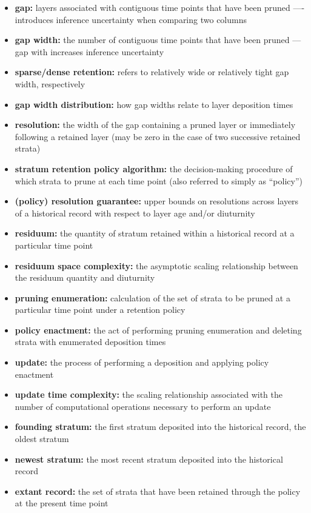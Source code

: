 \begin{itemize}
  \item \textbf{gap:} layers associated with contiguous time points that have been pruned ---- introduces inference uncertainty when comparing two columns
  \item \textbf{gap width:} the number of contiguous time points that have been pruned --- gap with increases inference uncertainty
  \item \textbf{sparse/dense retention:} refers to relatively wide or relatively tight gap width, respectively
  \item \textbf{gap width distribution:} how gap widths relate to layer deposition times
  \item \textbf{resolution:} the width of the gap containing a pruned layer or immediately following a retained layer (may be zero in the case of two successive retained strata)
  \item \textbf{stratum retention policy algorithm:} the decision-making procedure of which strata to prune at each time point (also referred to simply as ``policy'')
  \item \textbf{(policy) resolution guarantee:} upper bounds on resolutions across layers of a historical record with respect to layer age and/or diuturnity
  \item \textbf{residuum:} the quantity of stratum retained within a historical record at a particular time point
  \item \textbf{residuum space complexity:} the asymptotic scaling relationship between the residuum quantity and diuturnity
  \item \textbf{pruning enumeration:} calculation of the set of strata to be pruned at a particular time point under a retention policy
  \item \textbf{policy enactment:} the act of performing pruning enumeration and deleting strata with enumerated deposition times
  \item \textbf{update:} the process of performing a deposition and applying policy enactment
  \item \textbf{update time complexity:} the scaling relationship associated with the number of computational operations necessary to perform an update
  \item \textbf{founding stratum:} the first stratum deposited into the historical record, the oldest stratum
  \item \textbf{newest stratum:} the most recent stratum deposited into the historical record
  \item \textbf{extant record:} the set of strata that have been retained through the policy at the present time point

\end{itemize}
